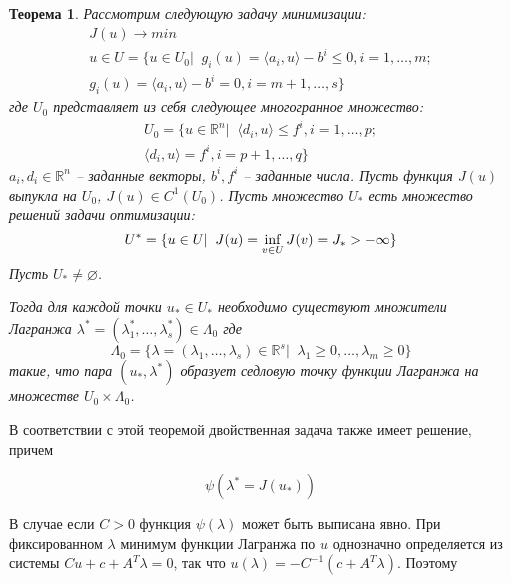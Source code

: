 \documentclass[a4paper, 12pt, titlepage]{article}
\theoremstyle{definition}
\theoremstyle{plain}
\newtheorem{SmartTheorem}{Теорема}
\theoremstyle{plain}
\begin{document}
\begin{SmartTheorem}
 Рассмотрим следующую задачу минимизации:
 \begin{equation}
  \begin{aligned}
  J(u) \to min \\
  u \in U = \{u \in U_{0} | \;\;
  g_{i}(u) = \langle a_{i}, u \rangle  - b^{i} \leq 0, i = 1, \ldots, m; \\
  g_{i}(u) = \langle a_{i}, u \rangle  - b^{i} = 0, i = m + 1, \ldots, s \}
  \end{aligned}
 \end{equation}
 где $U_{0}$ представляет из себя следующее многогранное множество:
 \begin{equation}
  \begin{aligned}
   U_{0} = \{u \in \mathbb{R}^{n} | \;\;
   \langle d_{i}, u \rangle \leq f^{i}, i = 1, \ldots, p; \\
   \langle d_{i}, u \rangle = f^{i}, i = p + 1, \ldots, q \}
  \end{aligned}
 \end{equation}
 $a_{i}, d_{i} \in \mathbb{R}^{n}$ -- заданные векторы, $b^{i}, f^{i}$ --
 заданные числа.
 Пусть функция $J(u)$ выпукла на $U_{0}$, $J(u) \in C^{1}(U_{0})$.
 Пусть множество $U_{*}$ есть множество решений задачи оптимизации:
 \begin{equation}
  U^{*} = \{u \in U | \;\; J(u) = \operatornamewithlimits{inf}_{v \in U} J(v)
  = J_{*} > - \infty\}
 \end{equation}
 Пусть $U_{*} \neq \varnothing$.
 
 Тогда для каждой точки $u_{*} \in U_{*}$ необходимо существуют множители
 Лагранжа
 $\lambda^{*} = (\lambda_{1}^{*}, \ldots, \lambda_{s}^{*}) \in \Lambda_{0}$
 где
 \begin{equation}
  \Lambda_{0} = \{\lambda = (\lambda_{1}, \ldots, \lambda_{s})
  \in \mathbb{R}^{s} | \;\; \lambda_{1} \geq 0, \ldots, \lambda_{m} \geq 0 \}
 \end{equation}
 такие, что пара $(u_{*}, \lambda^{*})$ образует седловую точку функции Лагранжа
 на множестве $U_{0} \times \Lambda_{0}$.
\end{SmartTheorem}

В соответствии с этой теоремой двойственная задача также имеет решение, причем

\begin{equation}
 \psi(\lambda^{*} = J(u_{*}))
\end{equation}

В случае если $C > 0$ функция $\psi(\lambda)$ может быть выписана явно. При
фиксированном $\lambda$ минимум функции Лагранжа по $u$ однозначно определяется
из системы $C u + c + A^{T} \lambda = 0$, так что
$u(\lambda) = - C^{-1} (c + A^{T} \lambda)$. Поэтому
\end{document}
